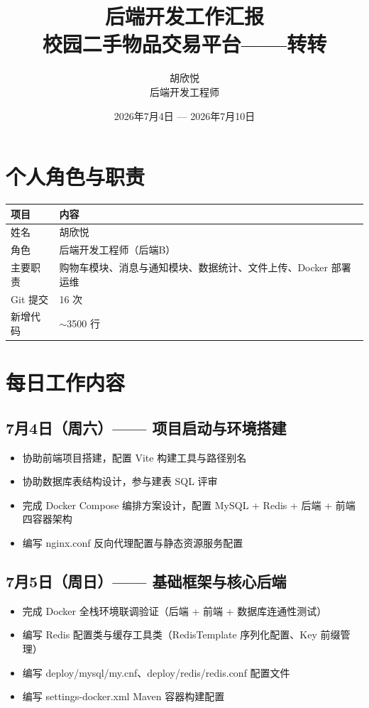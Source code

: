 \documentclass[12pt,a4paper]{ctexart}
\title{{\Huge 后端开发工作汇报}\\[0.3cm]{\Large 校园二手物品交易平台——转转}}
\author{{\large 胡欣悦}\\{\small 后端开发工程师}}
\date{2026年7月4日 — 2026年7月10日}
\begin{document}
\maketitle
\thispagestyle{fancy}

\section{个人角色与职责}

\begin{table}[H]
\centering
\begin{tabular}{lp{10cm}}
\toprule
\textbf{项目} & \textbf{内容} \\
\midrule
姓名 & 胡欣悦 \\
角色 & 后端开发工程师（后端B） \\
主要职责 & 购物车模块、消息与通知模块、数据统计、文件上传、Docker 部署运维 \\
Git 提交 & 16 次 \\
新增代码 & $\sim$3500 行 \\
\bottomrule
\end{tabular}
\end{table}

\section{每日工作内容}

\subsection{7月4日（周六）—— 项目启动与环境搭建}
\begin{itemize}
    \item 协助前端项目搭建，配置 Vite 构建工具与路径别名
    \item 协助数据库表结构设计，参与建表 SQL 评审
    \item 完成 Docker Compose 编排方案设计，配置 MySQL + Redis + 后端 + 前端 四容器架构
    \item 编写 nginx.conf 反向代理配置与静态资源服务配置
\end{itemize}

\subsection{7月5日（周日）—— 基础框架与核心后端}
\begin{itemize}
    \item 完成 Docker 全栈环境联调验证（后端 + 前端 + 数据库连通性测试）
    \item 编写 Redis 配置类与缓存工具类（RedisTemplate 序列化配置、Key 前缀管理）
    \item 编写 deploy/mysql/my.cnf、deploy/redis/redis.conf 配置文件
    \item 编写 settings-docker.xml Maven 容器构建配置
\end{itemize}
\end{document}
